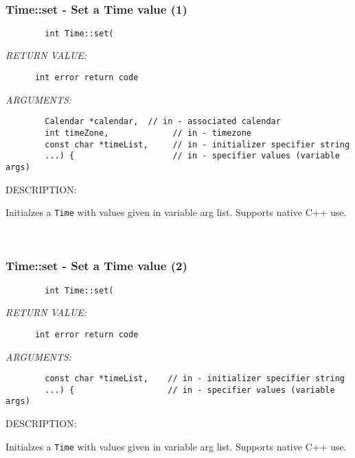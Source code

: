  
\mbox{}\hrulefill\ 
 
\subsubsection [Time::set] {Time::set - Set a Time value (1)}


  
\begin{verbatim}        int Time::set(\end{verbatim}{\em RETURN VALUE:}
\begin{verbatim}      int error return code\end{verbatim}{\em ARGUMENTS:}
\begin{verbatim}        Calendar *calendar,  // in - associated calendar
        int timeZone,             // in - timezone
        const char *timeList,     // in - initializer specifier string
        ...) {                    // in - specifier values (variable args)\end{verbatim}
{\sf DESCRIPTION:\\ }


        Initialzes a {\tt Time} with values given in variable arg list.
        Supports native C++ use.
   
 
\mbox{}\hrulefill\ 
 
\subsubsection [Time::set] {Time::set - Set a Time value (2)}


  
\begin{verbatim}        int Time::set(\end{verbatim}{\em RETURN VALUE:}
\begin{verbatim}      int error return code\end{verbatim}{\em ARGUMENTS:}
\begin{verbatim}        const char *timeList,    // in - initializer specifier string
        ...) {                   // in - specifier values (variable args)\end{verbatim}
{\sf DESCRIPTION:\\ }


        Initialzes a {\tt Time} with values given in variable arg list.
        Supports native C++ use.
   
